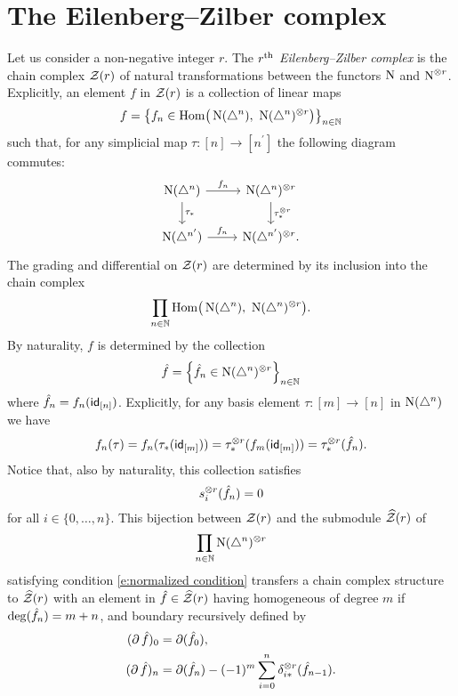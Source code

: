 \section{The Eilenberg--Zilber complex}

Let us consider a non-negative integer $r$.
The \textit{$r^\mathrm{th}$ Eilenberg--Zilber complex} is the chain complex $\mathcal{Z}(r)$ of natural transformations between the functors $\operatorname{N}$ and $\operatorname{N}^{\otimes r}$.
Explicitly, an element $f$ in $\mathcal{Z}(r)$ is a collection of linear maps
\[
f = \left\{ f_n \in \mathrm{Hom} \big( \operatorname{N}(\triangle^n), \ \operatorname{N}(\triangle^n)^{\otimes r} \big) \right\}_{n \in \mathbb{N}}
\]
such that, for any simplicial map $\tau \colon [n] \to [n^\prime]$ the following diagram commutes:
\[
\begin{tikzcd}
\chains(\simplex^n) \arrow[r, "f_n"] \arrow[d, "\tau_\ast"] &
\chains(\simplex^n)^{\otimes r} \arrow[d, "\tau_\ast^{\otimes r}"] \\
\chains(\simplex^{n^\prime}) \arrow[r, "f_n"] &
\chains(\simplex^{n^\prime})^{\otimes r}.
\end{tikzcd}
\]
The grading and differential on $\mathcal{Z}(r)$ are determined by its inclusion into the chain complex
\[
\prod_{n \in \mathbb{N}} \mathrm{Hom} \big( \operatorname{N}(\triangle^n), \ \operatorname{N}(\triangle^n)^{\otimes r} \big).
\]
By naturality, $f$ is determined by the collection
\[
\hat{f} = \left\{ \hat{f}_n \in \operatorname{N}(\triangle^n)^{\otimes r}  \right\}_{n \in \mathbb{N}}
\]
where $\hat{f}_n = f_n(\mathsf{id}_{[n]})$.
Explicitly, for any basis element $\tau \colon [m] \to [n]$ in $\operatorname{N}(\triangle^n)$ we have
\[
f_n(\tau) = f_n(\tau_\ast(\mathsf{id}_{[m]})) = \tau_\ast^{\otimes r}(f_m(\mathsf{id}_{[m]})) = \tau_\ast^{\otimes r}(\hat{f}_n).
\]
Notice that, also by naturality, this collection satisfies
\begin{equation} \label{e:normalized condition}
s_i^{\otimes r}(\hat{f}_n) = 0
\end{equation}
for all $i \in \{0, \dots, n\}$.
This bijection between $\mathcal{Z}(r)$ and the submodule $\widehat{\mathcal{Z}}(r)$ of
\[
\prod_{n \in \mathbb{N}} \operatorname{N}(\triangle^n)^{\otimes r}
\]
satisfying condition \eqref{e:normalized condition} transfers a chain complex structure to $\widehat{\mathcal{Z}}(r)$ with an element in $\hat{f} \in \widehat{\mathcal{Z}}(r)$ having homogeneous of degree $m$ if $\deg(\hat{f}_n) = m+n$, and boundary recursively defined by
\begin{align*}
(\operatorname{\partial} \hat{f})_0 &=
\operatorname{\partial}(\hat{f}_0), \\
(\operatorname{\partial} \hat{f})_n &=
\operatorname{\partial}(\hat{f}_n) - (-1)^{m} \sum_{i=0}^{n} \delta_{i \ast}^{\otimes r}(\hat{f}_{n-1}).
\end{align*}